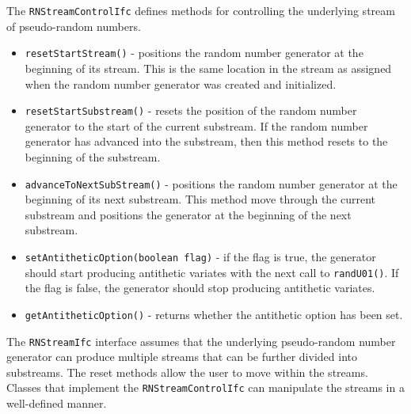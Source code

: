 \documentclass[
]{book}
\providecommand{\tightlist}{%
  \setlength{\itemsep}{0pt}\setlength{\parskip}{0pt}}
\theoremstyle{definition}
\theoremstyle{definition}
\theoremstyle{definition}
\theoremstyle{definition}
\theoremstyle{remark}
\begin{document}
The \texttt{RNStreamControlIfc} defines methods for controlling the underlying stream of pseudo-random numbers.

\begin{itemize}
\tightlist
\item
  \texttt{resetStartStream()} - positions the random number generator at the
  beginning of its stream. This is the same location in the stream as
  assigned when the random number generator was created and
  initialized.
\item
  \texttt{resetStartSubstream()} - resets the position of the random number
  generator to the start of the current substream. If the random
  number generator has advanced into the substream, then this method
  resets to the beginning of the substream.
\item
  \texttt{advanceToNextSubStream()} - positions the random number generator at
  the beginning of its next substream. This method move through the
  current substream and positions the generator at the beginning of
  the next substream.
\item
  \texttt{setAntitheticOption(boolean\ flag)} - if the flag is true, the
  generator should start producing antithetic variates with the next
  call to \texttt{randU01()}. If the flag is false, the generator should stop
  producing antithetic variates.
\item
  \texttt{getAntitheticOption()} - returns whether the antithetic option has
  been set.
\end{itemize}

The \texttt{RNStreamIfc} interface assumes that the underlying pseudo-random number generator can produce
multiple streams that can be further divided into substreams. The reset
methods allow the user to move within the streams. Classes that
implement the \texttt{RNStreamControlIfc} can manipulate the streams in a
well-defined manner.
\end{document}
